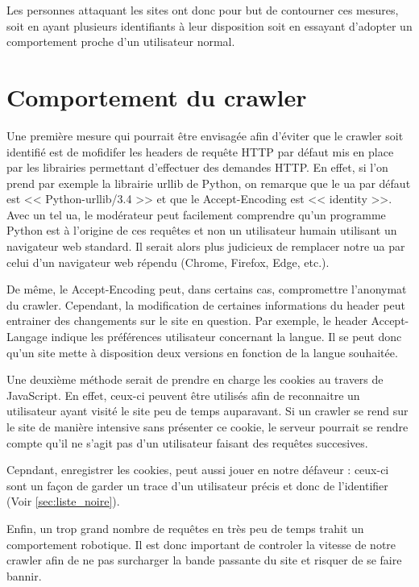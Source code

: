 \documentclass[hideweeklyreports,noposter]{polytech/polytech}
\begin{document}
		Les personnes attaquant les sites ont donc pour but de contourner ces mesures, soit en ayant plusieurs identifiants à leur disposition soit en essayant d'adopter un comportement proche d'un utilisateur normal.
		
		\section{Comportement du crawler}
            Une première mesure qui pourrait être envisagée afin d'éviter que le crawler soit identifié est de mofidifer les headers de requête HTTP par défaut mis en place par les librairies permettant d'effectuer des demandes HTTP.
            En effet, si l'on prend par exemple la librairie urllib de Python, on remarque que le \gls{ua} par défaut est << Python-urllib/3.4 >> et que le Accept-Encoding est << identity >>.
            Avec un tel \gls{ua}, le modérateur peut facilement comprendre qu'un programme Python est à l'origine de ces requêtes et non un utilisateur humain utilisant un navigateur web standard.
            Il serait alors plus judicieux de remplacer notre \gls{ua} par celui d'un navigateur web répendu (Chrome, Firefox, Edge, etc.).
            
            De même, le Accept-Encoding peut, dans certains cas, compromettre l'anonymat du crawler.
            Cependant, la modification de certaines informations du header peut entrainer des changements sur le site en question.
            Par exemple, le header Accept-Langage indique les préférences utilisateur concernant la langue. 
            Il se peut donc qu'un site mette à disposition deux versions en fonction de la langue souhaitée.
            
            
            Une deuxième méthode serait de prendre en charge les cookies au travers de JavaScript.
            En effet, ceux-ci peuvent être utilisés afin de reconnaitre un utilisateur ayant visité le site peu de temps auparavant.
            Si un crawler se rend sur le site de manière intensive sans présenter ce cookie, le serveur pourrait se rendre compte qu'il ne s'agit pas d'un utilisateur faisant des requêtes succesives.
            
            Cepndant, enregistrer les cookies, peut aussi jouer en notre défaveur : ceux-ci sont un façon de garder un trace d'un utilisateur précis et donc de l'identifier (Voir \autoref{sec:liste_noire}).
            
            
            Enfin, un trop grand nombre de requêtes en très peu de temps trahit un comportement robotique.
            Il est donc important de controler la vitesse de notre crawler afin de ne pas surcharger la bande passante du site et risquer de se faire bannir.
            
\end{document}
